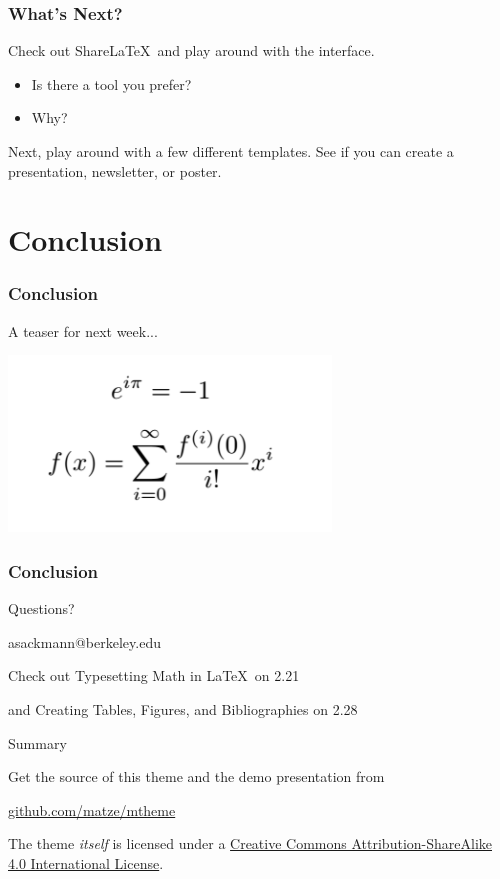 \documentclass[12pt, compress]{beamer}
\begin{document}
\begin{frame}[fragile]
    \frametitle{What's Next?}
    Check out Share\LaTeX\ and play around with the interface.
    \begin{itemize}
        \item Is there a tool you prefer?
        \item Why?
    \end{itemize}
    Next, play around with a few different templates. See if you can create a presentation, newsletter, or poster.
\end{frame}

\section{Conclusion}

\begin{frame}[fragile]
    \frametitle{Conclusion}
    \begin{center}A teaser for next week...\end{center}
    \begin{center}\includegraphics[scale=.5]{images/math.png}\end{center}
\end{frame}

\begin{frame}[fragile]
    \frametitle{Conclusion}
\begin{center}Questions?\end{center}

\begin{center}asackmann@berkeley.edu\end{center}

Check out Typesetting Math in \LaTeX\ on 2.21 

and Creating Tables, Figures, and Bibliographies on 2.28

\end{frame}

\begin{frame}{Summary}

  Get the source of this theme and the demo presentation from

  \begin{center}\url{github.com/matze/mtheme}\end{center}

  The theme \emph{itself} is licensed under a
  \href{http://creativecommons.org/licenses/by-sa/4.0/}{Creative Commons
  Attribution-ShareAlike 4.0 International License}.

  \begin{center}\ccbysa\end{center}

\end{frame}
\end{document}
